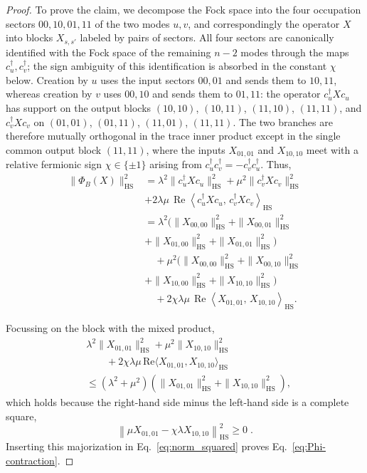 \documentclass[aps,prl,twocolumn,superscriptaddress,reprint,longbibliography,nofootinbib]{revtex4-2}
\begin{document}
\begin{proof}
To prove the claim, we decompose the Fock space into the four occupation sectors $00,10,01,11$ of the two modes $u,v$, and correspondingly the operator $X$ into blocks $X_{s,s'}$ labeled by pairs of sectors. All four sectors are canonically identified with the Fock space of the remaining $n-2$ modes through the maps $c_u^\dagger,c_v^\dagger$; the sign ambiguity of this identification is absorbed in the constant $\chi$ below. Creation by $u$ uses the input sectors $00,01$ and sends them to $10,11$, whereas creation by $v$ uses $00,10$ and sends them to $01,11$: the operator $c_u^\dagger Xc_u$ has support on the output blocks $(10,10)$, $(10,11)$, $(11,10)$, $(11,11)$, and $c_v^\dagger Xc_v$ on $(01,01)$, $(01,11)$, $(11,01)$, $(11,11)$. The two branches are therefore mutually orthogonal in the trace inner product except in the single common output block $(11,11)$, where the inputs $X_{01,01}$ and $X_{10,10}$ meet with a relative fermionic sign $\chi\in\{\pm1\}$ arising from $c_u^\dagger c_v^\dagger=-c_v^\dagger c_u^\dagger$.
Thus, 
\begin{equation}
\label{eq:norm_squared}
\begin{aligned}
\|\Phi_B(X)\|_{\mathrm{HS}}^2
&=
\lambda^2 \|c_u^\dagger X c_u\|_{\mathrm{HS}}^2
+\mu^2 \|c_v^\dagger X c_v\|_{\mathrm{HS}}^2
\\
&+2\lambda\mu\,
\operatorname{Re}
\left\langle
c_u^\dagger X c_u,\,
c_v^\dagger X c_v
\right\rangle_{\mathrm{HS}}
\\[1ex]
&=
\lambda^2
(
\|X_{00,00}\|_{\mathrm{HS}}^2
+\|X_{00,01}\|_{\mathrm{HS}}^2
\\
&+\|X_{01,00}\|_{\mathrm{HS}}^2
+\|X_{01,01}\|_{\mathrm{HS}}^2 )
\\
&\quad
+\mu^2
(
\|X_{00,00}\|_{\mathrm{HS}}^2
+\|X_{00,10}\|_{\mathrm{HS}}^2
\\
&+\|X_{10,00}\|_{\mathrm{HS}}^2
+\|X_{10,10}\|_{\mathrm{HS}}^2 )
\\
&\quad
+2\chi\lambda\mu\,
\operatorname{Re}
\left\langle
X_{01,01},\,X_{10,10}
\right\rangle_{\mathrm{HS}} .
\end{aligned}
\end{equation}

Focussing on the block with the mixed product,
\begin{equation}
\begin{split}
    &\lambda^2\|X_{01,01}\|_{\mathrm{HS}}^2+\mu^2\|X_{10,10}\|_{\mathrm{HS}}^2\\
    &\qquad +2\chi\lambda\mu\,\mathrm{Re}\langle X_{01,01},X_{10,10}\rangle_{\mathrm{HS}}\\
    &\le(\lambda^2+\mu^2)\left(\|X_{01,01}\|_{\mathrm{HS}}^2+\|X_{10,10}\|_{\mathrm{HS}}^2\right),
\end{split}\end{equation}
which holds because the right-hand side minus the  left-hand side is a complete square,
\begin{equation}
    \left\|\mu X_{01,01}-\chi\lambda X_{10,10}\right\|_{\mathrm{HS}}^2\ge0\;.
\end{equation}
Inserting this majorization in Eq.~\eqref{eq:norm_squared} proves Eq.~\eqref{eq:Phi-contraction}.


\end{proof}
\end{document}
